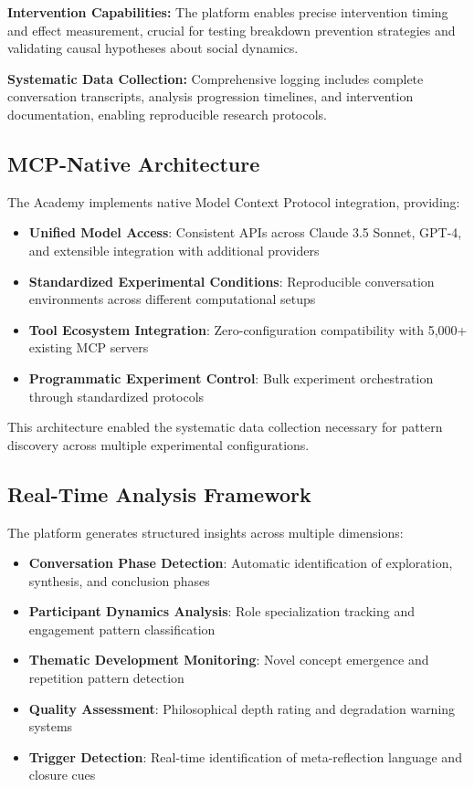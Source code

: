 \documentclass[11pt,letterpaper]{article}
\newcommand{\theacademy}{The Academy}
\begin{document}
\textbf{Intervention Capabilities:} The platform enables precise intervention timing and effect measurement, crucial for testing breakdown prevention strategies and validating causal hypotheses about social dynamics.

\textbf{Systematic Data Collection:} Comprehensive logging includes complete conversation transcripts, analysis progression timelines, and intervention documentation, enabling reproducible research protocols.

\subsection{MCP-Native Architecture}

\theacademy{} implements native Model Context Protocol integration, providing:

\begin{itemize}
    \item \textbf{Unified Model Access}: Consistent APIs across Claude 3.5 Sonnet, GPT-4, and extensible integration with additional providers
    \item \textbf{Standardized Experimental Conditions}: Reproducible conversation environments across different computational setups
    \item \textbf{Tool Ecosystem Integration}: Zero-configuration compatibility with 5,000+ existing MCP servers
    \item \textbf{Programmatic Experiment Control}: Bulk experiment orchestration through standardized protocols
\end{itemize}

This architecture enabled the systematic data collection necessary for pattern discovery across multiple experimental configurations.

\subsection{Real-Time Analysis Framework}

The platform generates structured insights across multiple dimensions:

\begin{itemize}
    \item \textbf{Conversation Phase Detection}: Automatic identification of exploration, synthesis, and conclusion phases
    \item \textbf{Participant Dynamics Analysis}: Role specialization tracking and engagement pattern classification
    \item \textbf{Thematic Development Monitoring}: Novel concept emergence and repetition pattern detection
    \item \textbf{Quality Assessment}: Philosophical depth rating and degradation warning systems
    \item \textbf{Trigger Detection}: Real-time identification of meta-reflection language and closure cues
\end{itemize}
\end{document}
